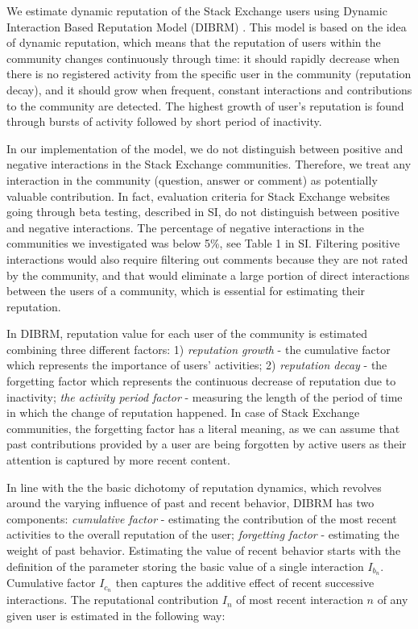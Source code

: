 We estimate dynamic reputation of the Stack Exchange users using Dynamic Interaction Based Reputation Model (DIBRM) \cite{melnikovDynamicInteractionBasedReputation2018}. This model is based on the idea of dynamic reputation, which means that the reputation of users within the community changes continuously through time: it should rapidly decrease when there is no registered activity from the specific user in the community (reputation decay), and it should grow when frequent, constant interactions
and contributions to the community are detected. The highest growth of user's reputation is found through bursts of activity followed by short period of inactivity. 

In our implementation of the model, we do not distinguish between positive and negative interactions in the Stack Exchange communities. Therefore, we treat any interaction in the community (question, answer or comment) as potentially valuable contribution. In fact, evaluation criteria for Stack Exchange websites going through beta testing, described in SI, do not distinguish between positive and negative interactions.
The percentage of negative interactions in the communities we investigated was below 5\%, see Table 1 in SI. Filtering positive interactions would also require filtering out comments because they are not rated by the community, and that would eliminate a large portion of
direct interactions between the users of a community, which is essential for estimating their reputation.

In DIBRM, reputation value for each user of the community is estimated combining three different factors: 1) \textit{reputation growth} - the cumulative factor which represents the importance of users' activities; 2) \textit{reputation decay} - the forgetting factor which represents the continuous decrease of reputation due to inactivity; \textit{the activity period factor} - measuring the length of the period of time in which the change of reputation happened. In case of Stack Exchange communities, the forgetting factor has a literal meaning, as we can assume that past contributions provided by a user are being forgotten by active users as their attention is captured by more recent content.

In line with the the basic dichotomy of reputation dynamics, which revolves around the varying influence of past and recent behavior, DIBRM has two components: \textit{cumulative factor} - estimating the contribution of the most recent activities to the overall reputation of the user; \textit{forgetting factor} - estimating the weight of past behavior. Estimating the value of recent behavior starts with the definition of the parameter storing the basic value of a single interaction $I_{b_{n}}$. Cumulative factor $I_{c_{n}}$ then captures the additive effect of recent successive interactions. The reputational contribution $I_n$ of most recent interaction $n$ of any given user is estimated in the following way:

